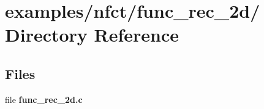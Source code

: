 \hypertarget{dir_000021}{
\section{examples/nfct/func\_\-rec\_\-2d/ Directory Reference}
\label{dir_000021}
}
\subsection*{Files}
\begin{CompactItemize}
\item 
file {\bf func\_\-rec\_\-2d.c}
\end{CompactItemize}
